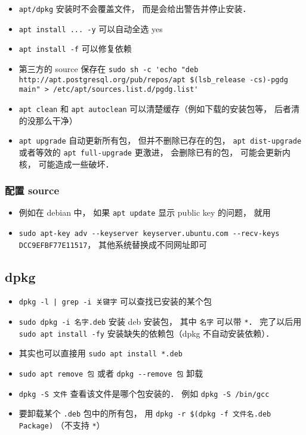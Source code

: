 \begin{itemize}
\item \verb|apt/dpkg| 安装时不会覆盖文件， 而是会给出警告并停止安装．
\item \verb|apt install ... -y| 可以自动全选 yes
\item \verb|apt install -f| 可以修复依赖
\item 第三方的 source 保存在 \verb|sudo sh -c 'echo "deb http://apt.postgresql.org/pub/repos/apt $(lsb_release -cs)-pgdg main" > /etc/apt/sources.list.d/pgdg.list'|
\item \verb|apt clean| 和 \verb|apt autoclean| 可以清楚缓存（例如下载的安装包等， 后者清的没那么干净）
\item \verb|apt upgrade| 自动更新所有包， 但并不删除已存在的包， \verb|apt dist-upgrade| 或者等效的 \verb|apt full-upgrade| 更激进， 会删除已有的包， 可能会更新内核， 可能造成一些破坏．
\end{itemize}

\subsubsection{配置 source}
\begin{itemize}
\item 例如在 debian 中， 如果 \verb|apt update| 显示 public key 的问题， 就用
\item \verb|sudo apt-key adv --keyserver keyserver.ubuntu.com --recv-keys DCC9EFBF77E11517|， 其他系统替换成不同网址即可
\end{itemize}


\subsection{dpkg}
\begin{itemize}
\item \verb`dpkg -l | grep -i 关键字` 可以查找已安装的某个包
\item \verb|sudo dpkg -i 名字.deb| 安装 deb 安装包， 其中 \verb|名字| 可以带 \verb|*|． 完了以后用 \verb|sudo apt install -fy| 安装缺失的依赖包（dpkg 不自动安装依赖）．
\item 其实也可以直接用 \verb|sudo apt install *.deb|
\item \verb|sudo apt remove 包| 或者 \verb|dpkg --remove 包| 卸载
\item \verb|dpkg -S 文件| 查看该文件是哪个包安装的． 例如 \verb|dpkg -S /bin/gcc|
\item 要卸载某个 \verb|.deb| 包中的所有包， 用 \verb|dpkg -r $(dpkg -f 文件名.deb Package)| （不支持 \verb|*|）
\end{itemize}

